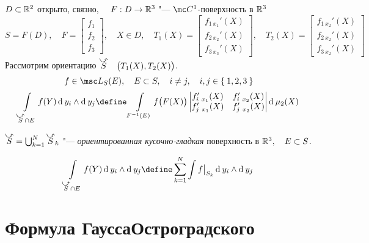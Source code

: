 \begin{definition}
	$ D \subset \mathbb{R}^2 $ открыто, связно, $ \quad F : D \to \mathbb{R}^3 $ "--- $ \mc C^1 $-поверхность в $ \mathbb{R}^3 $ \\
	$ S = F(D), \quad F =
	\begin{bmatrix}
		f_1 \\
		f_2 \\
		f_3
	\end{bmatrix}, \quad X \in D, \quad T_1(X) =
	\begin{bmatrix}
		f_{1~x_1}'(X) \\
		f_{2~x_2}'(X) \\
		f_{3~x_3}'(X)
	\end{bmatrix}, \quad T_2(X) =
	\begin{bmatrix}
		f_{1~x_2}'(X) \\
		f_{2~x_2}'(X) \\
		f_{3~x_2}'(X)
	\end{bmatrix} $ \\
	Рассмотрим ориентацию $ \curvedir S \quad \bigl(T_1(X), T_2(X) \bigr) $.
	$$ f \in \msc L_S(E), \quad E \sub S, \quad i \ne j, \quad i, j \in \set{1, 2, 3} $$
	$$ \int\limits_{\curvedir S \cap E} f(Y) \di y_i \wedge \di y_j \define \int\limits_{F^{-1}(E)} f \bigl(F(X) \bigr)
	\begin{vmatrix}
		f_{i~x_1}'(X) & f_{i~x_2}'(X) \\
		f_{j~x_1}'(X) & f_{j~x_2}'(X)
	\end{vmatrix} \di \mu_2(X) $$
\end{definition}

\begin{definition}
	$ \curvedir S = \bigcup_{k = 1}^N \curvedir S_k $ "--- \emph{ориентированная кусочно-гладкая} поверхность в $ \mathbb{R}^3, \quad E \subset S $.
	
	$$ \int\limits_{\curvedir S \cap E} f(Y) \di y_i \wedge \di y_j \define \sum_{k = 1}^N \int f\big|_{S_k}\di y_i \wedge \di y_j $$
\end{definition}

\section{Формула ГауссаОстроградского}


